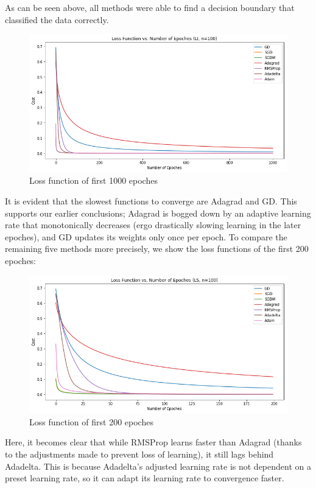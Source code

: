 \documentclass[twoside,11pt]{homework}
\begin{document}
As can be seen above, all methods were able to find a decision boundary that classified the data correctly.

	\begin{figure}[H]
		\centering
		\includegraphics[scale=.5]{q5/sep_100/loss_n1000.png}
		\caption{Loss function of first 1000 epoches}
	\end{figure}

It is evident that the slowest functions to converge are Adagrad and GD. This supports our earlier conclusions; Adagrad is bogged down by an adaptive learning rate that monotonically decreases (ergo drastically slowing learning in the later epoches), and GD updates its weights only once per epoch. To compare the remaining five methods more precisely, we show the loss functions of the first 200 epoches:

	\begin{figure}[H]
		\centering
		\includegraphics[scale=.5]{q5/sep_100/loss_n100.png}
		\caption{Loss function of first 200 epoches}
	\end{figure}

Here, it becomes clear that while RMSProp learns faster than Adagrad (thanks to the adjustments made to prevent loss of learning), it still lags behind Adadelta. This is because Adadelta's adjusted learning rate is not dependent on a preset learning rate, so it can adapt its learning rate to convergence faster.
\end{document}
